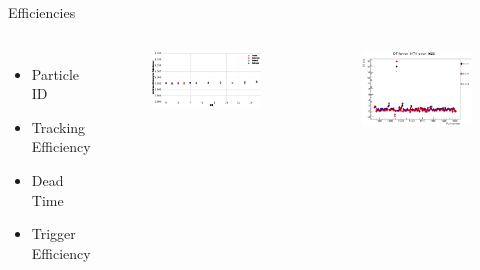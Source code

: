 \documentclass{beamer}
\begin{document}
\begin{frame}{Efficiencies}
	\begin{columns}

		\vspace{-80pt}
		\begin{itemize}
			\item Particle ID
			\item Tracking Efficiency
			\item Dead Time
			\item Trigger Efficiency
			
		\end{itemize}			
			
	\vspace{-40pt}
	\begin{figure}
		\includegraphics[width=7cm]{../images/pid_eff}
	\end{figure}
	\vspace{-25pt}
	\begin{figure}
		\includegraphics[width=7cm]{../images/DT}
	\end{figure}
	\end{columns}
\end{frame}
\end{document}
